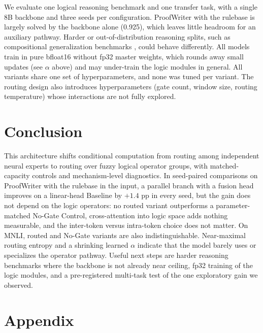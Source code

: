 \documentclass[10pt,twocolumn,letterpaper]{article}
\begin{document}
We evaluate one logical reasoning benchmark and one transfer task, with a single
8B backbone and three seeds per configuration. ProofWriter with the rulebase is
largely solved by the backbone alone (0.925), which leaves little headroom for
an auxiliary pathway. Harder or out-of-distribution reasoning splits, such as
compositional generalization benchmarks
\cite{keysers2020measuringcompositionalgeneralizationcomprehensive}, could
behave differently. All models train in pure bfloat16 without fp32 master
weights, which rounds away small updates (see $\alpha$ above) and may
under-train the logic modules in general. All variants share one set of
hyperparameters, and none was tuned per variant. The routing design also introduces
hyperparameters (gate count, window size, routing temperature) whose
interactions are not fully explored.

\section{Conclusion}

This architecture shifts conditional computation from routing among
independent neural experts to routing over fuzzy logical operator groups, with
matched-capacity controls and mechanism-level diagnostics. In seed-paired
comparisons on ProofWriter with the rulebase in the input, a parallel branch
with a fusion head improves on a linear-head Baseline by $+1.4$ pp in every
seed, but the gain does not depend on the logic operators: no routed variant
outperforms a parameter-matched No-Gate Control, cross-attention into logic
space adds nothing measurable, and the inter-token versus intra-token choice
does not matter. On MNLI, routed and No-Gate variants are also
indistinguishable. Near-maximal routing entropy and a shrinking learned
$\alpha$ indicate that the model barely uses or specializes the operator
pathway. Useful next steps are harder reasoning benchmarks where the backbone is not
already near ceiling, fp32 training of the logic modules, and a pre-registered
multi-task test of the one exploratory gain we observed.

{\small


}

\appendix
\section*{Appendix}

\setcounter{figure}{0}
\setcounter{table}{0}
\setcounter{equation}{0}
\renewcommand{\thefigure}{A\arabic{figure}}
\renewcommand{\thetable}{A\arabic{table}}
\renewcommand{\theequation}{A\arabic{equation}}
\end{document}
